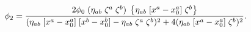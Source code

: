 \begin{equation}
\phi_2 = {2 \phi_0 \; (\eta_{ab} \; \zeta^a \; \zeta^b) \;
\left\{\eta_{ab} \;[x^a-x_0^a] \; \zeta^b  \right\}
\over
(\eta_{ab} \;[x^a-x_0^a] \; [x^b-x_0^b] - \eta_{ab} \; \zeta^a \; \zeta^b  )^2 +
4 (\eta_{ab} \;[x^a-x_0^a] \; \zeta^b)^2}.
\end{equation}

